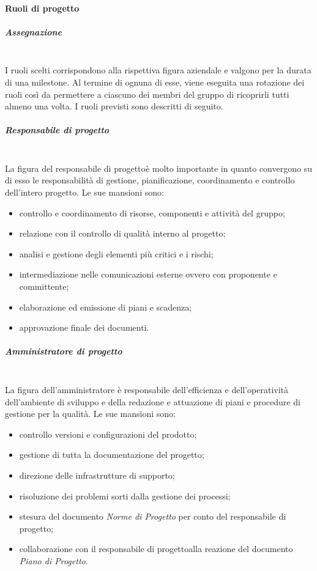 		\paragraph{Ruoli di progetto}
			\subparagraph{Assegnazione}\mbox{}\\ [1mm]
				I ruoli scelti corrispondono alla rispettiva figura aziendale e valgono per la durata di una milestone. Al termine di ognuna di esse, viene eseguita una rotazione dei ruoli così da permettere a ciascuno dei membri del gruppo di ricoprirli tutti almeno una volta.
				I ruoli previsti sono descritti di seguito.
			\subparagraph{Responsabile di progetto}\mbox{}\\ [1mm]
				La figura del responsabile di progetto\glosp è molto importante in quanto convergono su di esso le responsabilità di gestione, pianificazione, coordinamento e controllo dell'intero progetto\glo.
				Le sue mansioni sono:
				\begin{itemize}
					\item controllo e coordinamento di risorse, componenti e attività del gruppo;
					\item relazione con il controllo di qualità interno al progetto\glo;
					\item analisi e gestione degli elementi più critici e i rischi;
					\item intermediazione nelle comunicazioni esterne ovvero con proponente e committente;
					\item elaborazione ed emissione di piani e scadenza;
					\item approvazione finale dei documenti.
				\end{itemize}
			\subparagraph{Amministratore di progetto}\mbox{}\\ [1mm]
				La figura dell'amministratore è responsabile dell'efficienza e dell'operatività dell'ambiente di sviluppo e della redazione e attuazione di piani e procedure di gestione per la qualità.
				Le sue mansioni sono:
				\begin{itemize}
					\item controllo versioni e configurazioni del prodotto\glo;
					\item gestione di tutta la documentazione del progetto\glo;
					\item direzione delle infrastrutture di supporto;
					\item risoluzione dei problemi sorti dalla gestione dei processi\glo;
					\item stesura del documento \textit{Norme di Progetto} per conto del responsabile di progetto\glo;
					\item collaborazione con il responsabile di progetto\glo alla reazione del documento \textit{Piano di Progetto}.
				\end{itemize}
